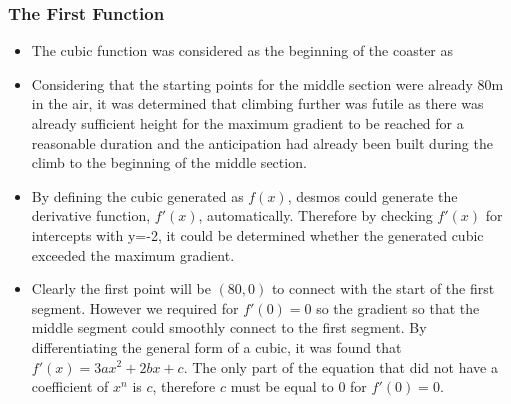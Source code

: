 \documentclass[11pt, letterpaper]{article}
\begin{document}
\subsubsection{The First Function}
\begin{itemize}
	\item The cubic function was considered as the beginning of the coaster as 
	\item Considering that the starting points for the middle section were already 80m in the air, it was determined that climbing further was futile as there was already sufficient height for the maximum gradient to be reached for a reasonable duration and the anticipation had already been built during the climb to the beginning of the middle section. 
	
	

	
	\item By defining the cubic generated as $f(x)$, desmos could generate the derivative function, $f'(x)$, automatically. Therefore by checking $f'(x)$ for intercepts with y=-2, it could be determined whether the generated cubic exceeded the maximum gradient.
	\item Clearly the first point will be $(80, 0)$ to connect with the start of the first segment. However we required for $f'(0)=0$ so the gradient so that the middle segment could smoothly connect to the first segment. By differentiating the general form of a cubic, it was found that $f'(x)=3ax^2+2bx+c$. The only part of the equation that did not have a coefficient of $x^n$ is $c$, therefore $c$ must be equal to $0$ for $f'(0)=0$.
	

\end{itemize}
\end{document}
